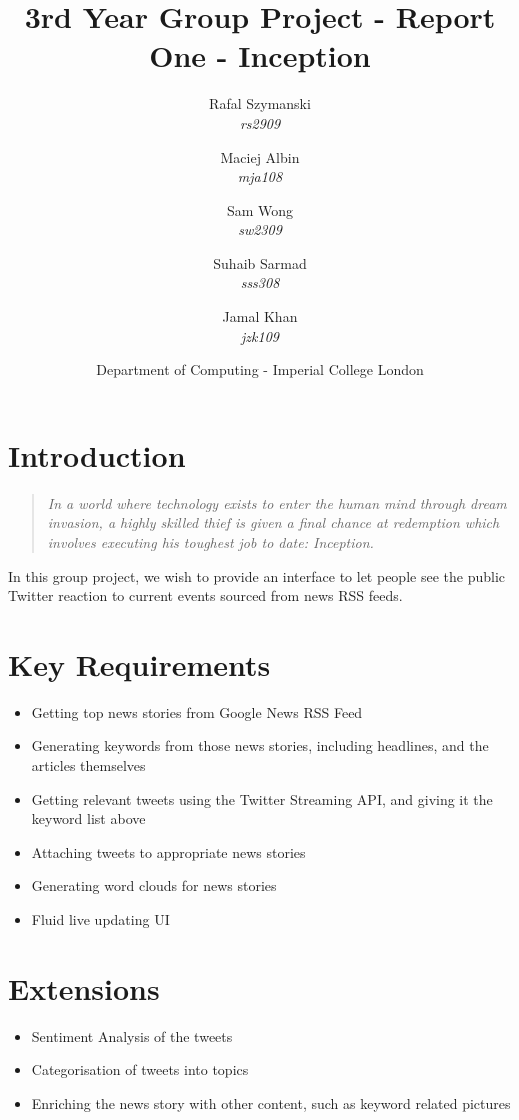 \documentclass[a4paper,11pt]{article}
\title{3rd Year Group Project - Report One - Inception}
\author{
    \small{Rafal Szymanski}\\
		\small{\emph{rs2909}}
  	\and
    \small{Maciej Albin}\\
		\small{\emph{mja108}}
    \and
    \small{Sam Wong}\\
		\small{\emph{sw2309}}
    \and
    \small{Suhaib Sarmad}\\
		\small{\emph{sss308}}
		\and
		\small{Jamal Khan}\\
		\small{\emph{jzk109}}
		\and
		Department of Computing - Imperial College London
}
\begin{document}
 
	\maketitle
	\tableofcontents
	\newpage
	
	\section{Introduction}
	
	\begin{quote}
\emph{		In a world where technology exists to enter the human mind through dream invasion, a highly skilled thief is given a final chance at redemption which involves executing his toughest job to date: Inception.}	\end{quote}

	In this group project, we wish to provide an interface to let people see the public Twitter reaction to current events sourced from news RSS feeds.

	
	\section{Key Requirements}
		
		\begin{itemize}
			\item Getting top news stories from Google News RSS Feed
			\item Generating keywords from those news stories, including headlines, and the articles themselves
			\item Getting relevant tweets using the Twitter Streaming API, and giving it the keyword list above
			\item Attaching tweets to appropriate news stories
			\item Generating word clouds for news stories
			\item Fluid live updating UI
		\end{itemize}
		
	\section{Extensions}
	
		\begin{itemize}
			\item Sentiment Analysis of the tweets
			\item Categorisation of tweets into topics
			\item Enriching the news story with other content, such as keyword related pictures
		\end{itemize}
	
\end{document}
